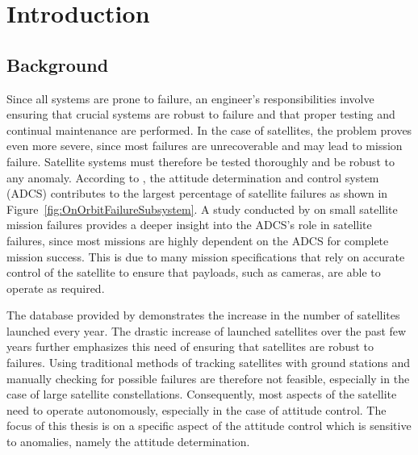 %
%


\chapter{Introduction}
\label{chap:Introduction}
\section{Background}
Since all systems are prone to failure, an engineer's responsibilities involve ensuring that crucial systems are robust to failure and that proper testing and continual maintenance are performed. In the case of satellites, the problem proves even more severe, since most failures are unrecoverable and may lead to mission failure. Satellite systems must therefore be tested thoroughly and be robust to any anomaly. According to \cite{tafazoli2009study}, the attitude determination and control system (ADCS) contributes to the largest percentage of satellite failures as shown in Figure~\ref{fig:OnOrbitFailureSubsystem}. A study conducted by \cite{Jacklin2019} on small satellite mission failures provides a deeper insight into the ADCS's role in satellite failures, since most missions are highly dependent on the ADCS for complete mission success. This is due to many mission specifications that rely on accurate control of the satellite to ensure that payloads, such as cameras, are able to operate as required.



The database provided by \cite{swartwout2015cubesat} demonstrates the increase in the number of satellites launched every year. The drastic increase of launched satellites over the past few years further emphasizes this need of ensuring that satellites are robust to failures. Using traditional methods of tracking satellites with ground stations and manually checking for possible failures are therefore not feasible, especially in the case of large satellite constellations. Consequently, most aspects of the satellite need to operate autonomously, especially in the case of attitude control. The focus of this thesis is on a specific aspect of the attitude control which is sensitive to anomalies, namely the attitude determination. 

